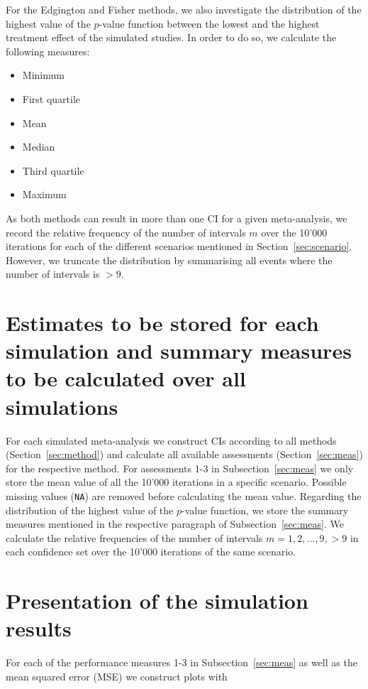 \documentclass[letterpaper, 12pt]{article}
\begin{document}
\vspace*{.5cm}

For the Edgington and Fisher methods, we also investigate the
distribution of the highest value of the $p$-value function between the lowest
and the highest treatment effect of the simulated studies. In order to do so,
we calculate the following measures:

\begin{itemize}
\item Minimum
\item First quartile
\item Mean
\item Median
\item Third quartile
\item Maximum
\end{itemize}

\vspace*{.5cm}

As both methods can result in more than one CI for a given meta-analysis,
we record the relative frequency of the number of intervals $m$ over the
10'000 iterations for each of the different scenarios mentioned in
Section~\ref{sec:scenario}. However, we truncate the distribution
by summarising all events where the number of intervals is $> 9$.

\section{
  Estimates to be stored for each simulation and summary measures to
  be calculated over all simulations
}
For each simulated meta-analysis we construct CIs according to all methods
(Section~\ref{sec:method}) and calculate all available assessments
(Section~\ref{sec:meas}) for the respective method. For assessments 1-3 in
Subsection~\ref{sec:meas} we only store the mean value of all the 10'000
iterations in a specific scenario. Possible missing values (\texttt{NA}) are
removed before calculating the mean value. Regarding the distribution of the
highest value of the $p$-value function, we store the summary measures mentioned
in the respective paragraph of Subsection~\ref{sec:meas}. We calculate the
relative frequencies of the number of intervals $m=1, 2, \ldots, 9, >9$ in each
confidence set over the 10'000 iterations of the same scenario.

\section{Presentation of the simulation results}
For each of the performance measures 1-3 in Subsection~\ref{sec:meas} as well as
the mean squared error (MSE) we construct plots with
\end{document}
